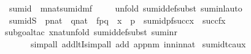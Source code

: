\begin{isabellebody}
\isanewline
{}\isamarkupfalse%
\ sum{\isacharunderscore}{\kern0pt}id{}\ {\isacharcolon}{\kern0pt}\ {\isachardoublequoteopen}m{\isasymin}nat{\isasymLongrightarrow}sum{\isacharunderscore}{\kern0pt}id{\isacharparenleft}{\kern0pt}m{\isacharcomma}{\kern0pt}f{\isacharparenright}{\kern0pt}{\isacharbackquote}{\kern0pt}{}\ {\isacharequal}{\kern0pt}\ {}{\isachardoublequoteclose}\isanewline
%
\isadelimproof
\ \ %
\endisadelimproof
%
\isatagproof
{}\isamarkupfalse%
{\isacharparenleft}{\kern0pt}unfold\ sum{\isacharunderscore}{\kern0pt}id{\isacharunderscore}{\kern0pt}def{\isacharcomma}{\kern0pt}subst\ sum{\isacharunderscore}{\kern0pt}inl{\isacharcomma}{\kern0pt}auto{\isacharparenright}{\kern0pt}%
\endisatagproof
{\isafoldproof}%
%
\isadelimproof
\isanewline
%
\endisadelimproof
\isanewline
{}\isamarkupfalse%
\ sum{\isacharunderscore}{\kern0pt}idS\ {\isacharcolon}{\kern0pt}\ {\isachardoublequoteopen}p{\isasymin}nat\ {\isasymLongrightarrow}\ q{\isasymin}nat\ {\isasymLongrightarrow}\ f{\isasymin}p{\isasymrightarrow}q\ {\isasymLongrightarrow}\ x\ {\isasymin}\ p\ {\isasymLongrightarrow}\ sum{\isacharunderscore}{\kern0pt}id{\isacharparenleft}{\kern0pt}p{\isacharcomma}{\kern0pt}f{\isacharparenright}{\kern0pt}{\isacharbackquote}{\kern0pt}{\isacharparenleft}{\kern0pt}succ{\isacharparenleft}{\kern0pt}x{\isacharparenright}{\kern0pt}{\isacharparenright}{\kern0pt}\ {\isacharequal}{\kern0pt}\ succ{\isacharparenleft}{\kern0pt}f{\isacharbackquote}{\kern0pt}x{\isacharparenright}{\kern0pt}{\isachardoublequoteclose}\isanewline
%
\isadelimproof
\ \ %
\endisadelimproof
%
\isatagproof
{}\isamarkupfalse%
{\isacharparenleft}{\kern0pt}subgoal{\isacharunderscore}{\kern0pt}tac\ {\isachardoublequoteopen}x{\isasymin}nat{\isachardoublequoteclose}{\isacharcomma}{\kern0pt}unfold\ sum{\isacharunderscore}{\kern0pt}id{\isacharunderscore}{\kern0pt}def{\isacharcomma}{\kern0pt}subst\ sum{\isacharunderscore}{\kern0pt}inr{\isacharcomma}{\kern0pt}\isanewline
\ \ \ \ \ \ simp{\isacharunderscore}{\kern0pt}all\ add{\isacharcolon}{\kern0pt}ltI{\isacharcomma}{\kern0pt}simp{\isacharunderscore}{\kern0pt}all\ add{\isacharcolon}{\kern0pt}\ app{\isacharunderscore}{\kern0pt}nm\ in{\isacharunderscore}{\kern0pt}n{\isacharunderscore}{\kern0pt}in{\isacharunderscore}{\kern0pt}nat{\isacharparenright}{\kern0pt}%
\endisatagproof
{\isafoldproof}%
%
\isadelimproof
\isanewline
%
\endisadelimproof
\isanewline
{}\isamarkupfalse%
\ sum{\isacharunderscore}{\kern0pt}id{\isacharunderscore}{\kern0pt}tc{\isacharunderscore}{\kern0pt}aux\ {\isacharcolon}{\kern0pt}\isanewline

\end{isabellebody}
